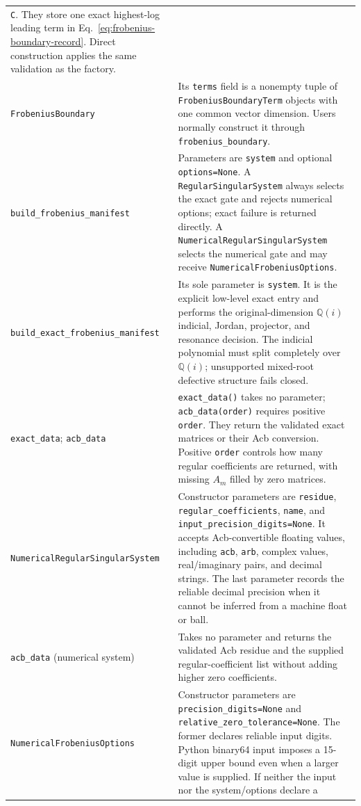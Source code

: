 \documentclass[11pt]{article}
\begin{document}
\begin{longtable}{L{0.36\textwidth}L{0.58\textwidth}}
\texttt{C}.  They store one exact highest-log leading term in
Eq.~\eqref{eq:frobenius-boundary-record}.  Direct construction applies the same validation
as the factory. \\
\texttt{FrobeniusBoundary} & Its \texttt{terms} field is a nonempty tuple of
\texttt{FrobeniusBoundaryTerm} objects with one common vector dimension.  Users normally
construct it through \texttt{frobenius\_boundary}. \\
\texttt{build\_frobenius\_manifest} & Parameters are \texttt{system} and optional
\texttt{options=None}.  A \texttt{RegularSingularSystem} always selects the exact gate and
rejects numerical options; exact failure is returned directly.  A
\texttt{NumericalRegularSingularSystem} selects the numerical gate and may receive
\texttt{NumericalFrobeniusOptions}. \\
\texttt{build\_exact\_frobenius\_manifest} & Its sole parameter is \texttt{system}.  It
is the explicit low-level exact entry and performs the original-dimension $\mathbb Q(i)$
indicial, Jordan, projector, and resonance decision.  The indicial polynomial must split
completely over $\mathbb Q(i)$;
unsupported mixed-root defective structure fails closed. \\
\texttt{exact\_data}; \texttt{acb\_data} & \texttt{exact\_data()} takes no parameter;
\texttt{acb\_data(order)} requires positive \texttt{order}.  They return the
validated exact matrices or their Acb conversion.  Positive \texttt{order} controls how
many regular coefficients are returned, with missing $A_m$ filled by zero matrices. \\
\texttt{NumericalRegularSingularSystem} & Constructor parameters are \texttt{residue},
\texttt{regular\_coefficients}, \texttt{name}, and
\texttt{input\_precision\_digits=None}.  It accepts Acb-convertible floating values,
including \texttt{acb}, \texttt{arb},
complex values, real/imaginary pairs, and decimal strings.  The last parameter records the
reliable decimal precision when it cannot be inferred from a machine float or ball. \\
\texttt{acb\_data} (numerical system) & Takes no parameter and returns the validated Acb residue and
the supplied regular-coefficient list without adding higher zero coefficients. \\
\texttt{NumericalFrobeniusOptions} & Constructor parameters are
\texttt{precision\_digits=None} and \texttt{relative\_zero\_tolerance=None}.  The former
declares reliable input digits.  Python binary64 input imposes a 15-digit upper bound even
when a larger value is supplied.  If neither the input nor the system/options declare a

\end{longtable}
\end{document}

